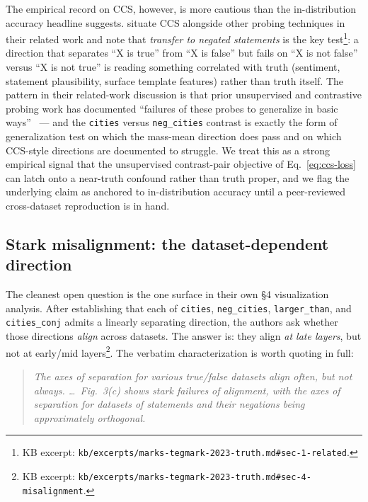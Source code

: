 The empirical record on CCS, however, is more cautious than the
in-distribution accuracy headline suggests.
\citet{marks-tegmark-2023-truth} situate CCS alongside other probing
techniques in their related work and note that \emph{transfer to
negated statements} is the key
test\footnote{KB excerpt:
\nolinkurl{kb/excerpts/marks-tegmark-2023-truth.md#sec-1-related}.}: a
direction that separates ``X is true'' from ``X is false'' but fails
on ``X is not false'' versus ``X is not true'' is reading something
correlated with truth (sentiment, statement plausibility, surface
template features) rather than truth itself. The pattern in their
related-work discussion is that prior unsupervised and contrastive
probing work has documented ``failures of these probes to generalize
in basic ways''~\citep[abstract]{marks-tegmark-2023-truth} --- and the
\texttt{cities} versus \texttt{neg\_cities} contrast is exactly the
form of generalization test on which the
\citeauthor{marks-tegmark-2023-truth} mass-mean direction does pass
and on which CCS-style directions are documented to struggle. We
treat this as a strong empirical signal that the unsupervised
contrast-pair objective of Eq.~\eqref{eq:ccs-loss} can latch onto a
near-truth confound rather than truth proper, and we flag the
underlying claim as anchored to in-distribution accuracy until a
peer-reviewed cross-dataset reproduction is in hand.

\subsection{Stark misalignment: the dataset-dependent direction}
\label{sec:truth-misalignment}

The cleanest open question is the one
\citet{marks-tegmark-2023-truth} surface in their own \S 4 visualization
analysis. After establishing that each of \texttt{cities},
\texttt{neg\_cities}, \texttt{larger\_than}, and \texttt{cities\_conj}
admits a linearly separating direction, the authors ask whether those
directions \emph{align} across datasets. The answer is: they align
\emph{at late layers}, but not at early/mid
layers\footnote{KB excerpt:
\nolinkurl{kb/excerpts/marks-tegmark-2023-truth.md#sec-4-misalignment}.}.
The verbatim characterization is worth quoting in full:

\begin{quote}
\itshape
The axes of separation for various true/false datasets align often,
but not always. \dots\ Fig.~3(c) shows stark failures of alignment,
with the axes of separation for datasets of statements and their
negations being approximately
orthogonal.~\citep[\S 4]{marks-tegmark-2023-truth}
\end{quote}

